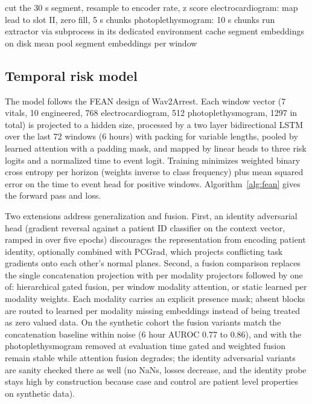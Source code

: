 \documentclass[11pt]{article}
\begin{document}
\begin{algorithm}[t]
\caption{Embedding extraction}
\label{alg:embed}
\begin{algorithmic}[1]
    \State cut the 30 s segment, resample to encoder rate, z score
    \State electrocardiogram: map lead to slot II, zero fill, 5 s chunks
    \State photoplethysmogram: 10 s chunks
\EndFor
{}
    \State run extractor via subprocess in its dedicated environment
    \State cache segment embeddings on disk
\EndFor
\State mean pool segment embeddings per window
\end{algorithmic}
\end{algorithm}

\subsection{Temporal risk model}
The model follows the FEAN design of Wav2Arrest. Each window vector (7 vitals,
10 engineered, 768 electrocardiogram, 512 photoplethysmogram, 1297 in total) is
projected to a hidden size, processed by a two layer bidirectional LSTM over the
last 72 windows (6 hours) with packing for variable lengths, pooled by learned
attention with a padding mask, and mapped by linear heads to three risk logits and
a normalized time to event logit. Training minimizes weighted binary cross entropy
per horizon (weights inverse to class frequency) plus mean squared error on the
time to event head for positive windows. Algorithm~\ref{alg:fean} gives the
forward pass and loss.

Two extensions address generalization and fusion. First, an identity adversarial
head (gradient reversal against a patient ID classifier on the context vector,
ramped in over five epochs) discourages the representation from encoding patient
identity, optionally combined with PCGrad, which projects conflicting task
gradients onto each other's normal planes. Second, a fusion comparison replaces
the single concatenation projection with per modality projectors followed by one
of: hierarchical gated fusion, per window modality attention, or static learned
per modality weights. Each modality carries an explicit presence mask; absent
blocks are routed to learned per modality missing embeddings instead of being
treated as zero valued data. On the synthetic cohort the fusion variants match the
concatenation baseline within noise (6 hour AUROC 0.77 to 0.86), and with the
photoplethysmogram removed at evaluation time gated and weighted fusion remain
stable while attention fusion degrades; the identity adversarial variants are
sanity checked there as well (no NaNs, losses decrease, and the identity probe
stays high by construction because case and control are patient level properties
on synthetic data).
\end{document}
